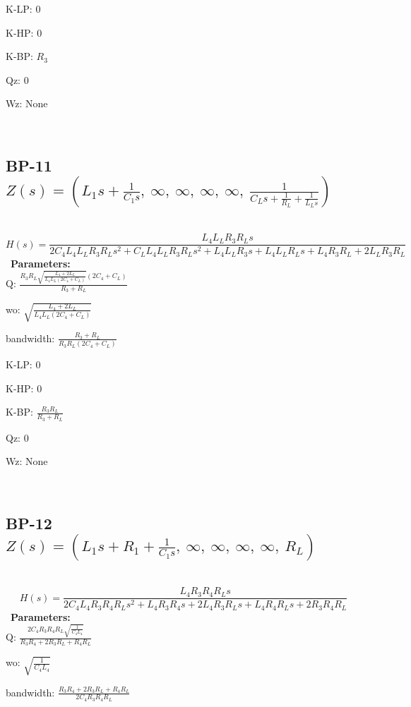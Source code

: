 \documentclass{article}
\begin{document}
K-LP: $0$\ 

K-HP: $0$\ 

K-BP: $R_{3}$\ 

Qz: $0$\ 

Wz: $\text{None}$\ 

\ 

\subsection{BP-11 $Z(s) = \left( L_{1} s + \frac{1}{C_{1} s}, \  \infty, \  \infty, \  \infty, \  \infty, \  \frac{1}{C_{L} s + \frac{1}{R_{L}} + \frac{1}{L_{L} s}}\right)$ } \ 
\textbf{\[H(s) = \frac{L_{4} L_{L} R_{3} R_{L} s}{2 C_{4} L_{4} L_{L} R_{3} R_{L} s^{2} + C_{L} L_{4} L_{L} R_{3} R_{L} s^{2} + L_{4} L_{L} R_{3} s + L_{4} L_{L} R_{L} s + L_{4} R_{3} R_{L} + 2 L_{L} R_{3} R_{L}}\] } \ 
\textbf{Parameters:}\\ 

Q: $\frac{R_{3} R_{L} \sqrt{\frac{L_{4} + 2 L_{L}}{L_{4} L_{L} \left(2 C_{4} + C_{L}\right)}} \left(2 C_{4} + C_{L}\right)}{R_{3} + R_{L}}$\ 

wo: $\sqrt{\frac{L_{4} + 2 L_{L}}{L_{4} L_{L} \left(2 C_{4} + C_{L}\right)}}$\ 

bandwidth: $\frac{R_{3} + R_{L}}{R_{3} R_{L} \left(2 C_{4} + C_{L}\right)}$\ 

K-LP: $0$\ 

K-HP: $0$\ 

K-BP: $\frac{R_{3} R_{L}}{R_{3} + R_{L}}$\ 

Qz: $0$\ 

Wz: $\text{None}$\ 

\ 

\subsection{BP-12 $Z(s) = \left( L_{1} s + R_{1} + \frac{1}{C_{1} s}, \  \infty, \  \infty, \  \infty, \  \infty, \  R_{L}\right)$ } \ 
\textbf{\[H(s) = \frac{L_{4} R_{3} R_{4} R_{L} s}{2 C_{4} L_{4} R_{3} R_{4} R_{L} s^{2} + L_{4} R_{3} R_{4} s + 2 L_{4} R_{3} R_{L} s + L_{4} R_{4} R_{L} s + 2 R_{3} R_{4} R_{L}}\] } \ 
\textbf{Parameters:}\\ 

Q: $\frac{2 C_{4} R_{3} R_{4} R_{L} \sqrt{\frac{1}{C_{4} L_{4}}}}{R_{3} R_{4} + 2 R_{3} R_{L} + R_{4} R_{L}}$\ 

wo: $\sqrt{\frac{1}{C_{4} L_{4}}}$\ 

bandwidth: $\frac{R_{3} R_{4} + 2 R_{3} R_{L} + R_{4} R_{L}}{2 C_{4} R_{3} R_{4} R_{L}}$\ 
\end{document}
